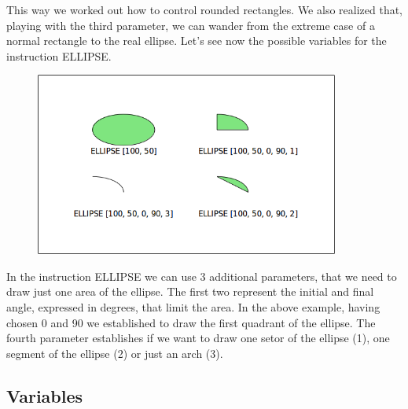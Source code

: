 \vskip 1cm
 
This way we worked out how to control rounded rectangles. We also realized that, playing with the third parameter, we can wander from the extreme case of a normal rectangle to the real ellipse.
Let's see now the possible variables for the instruction ELLIPSE.

\vskip 1cm

\begin{figure}[H]
   \centering
   \includegraphics[width=10.0cm,trim=8 8 8 8,clip]{./images/disegnare/disegnare-27.png}
   \label{dis-26}
\end{figure}

\vskip 1cm

In the instruction ELLIPSE we can use 3 additional parameters, that we need to draw just one area of the ellipse. The first two represent the initial and final angle, expressed in degrees, that limit the area. In the above example, having chosen 0 and 90 we established to draw the first quadrant of the ellipse. The fourth parameter establishes if we want to draw one setor of the ellipse (1), one segment of the ellipse (2) or just an arch (3).

\subsection{Variables} \label{sec:variabili}

